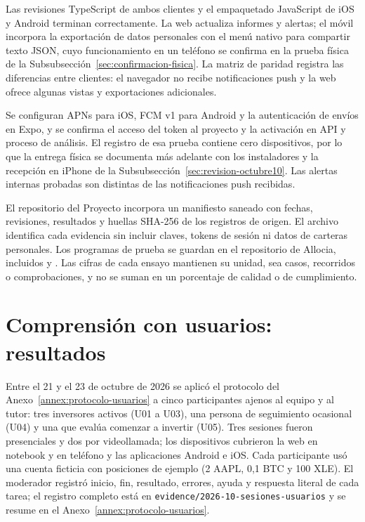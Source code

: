 Las revisiones TypeScript de ambos clientes y el empaquetado JavaScript de iOS y Android terminan correctamente. La web actualiza informes y alertas; el móvil incorpora la exportación de datos personales con el menú nativo para compartir texto JSON, cuyo funcionamiento en un teléfono se confirma en la prueba física de la Subsubsección~\ref{sec:confirmacion-fisica}. La matriz de paridad registra las diferencias entre clientes: el navegador no recibe notificaciones push y la web ofrece algunas vistas y exportaciones adicionales.

Se configuran APNs para iOS, FCM v1 para Android y la autenticación de envíos en Expo, y se confirma el acceso del token al proyecto y la activación en API y proceso de análisis. El registro de esa prueba contiene cero dispositivos, por lo que la entrega física se documenta más adelante con los instaladores y la recepción en iPhone de la Subsubsección~\ref{sec:revision-octubre10}. Las alertas internas probadas son distintas de las notificaciones push recibidas.

El repositorio del Proyecto incorpora un manifiesto saneado con fechas, revisiones, resultados y huellas SHA-256 de los registros de origen. El archivo  identifica cada evidencia sin incluir claves, tokens de sesión ni datos de carteras personales. Los programas de prueba se guardan en el repositorio de Allocia, incluidos  y . Las cifras de cada ensayo mantienen su unidad, sea casos, recorridos o comprobaciones, y no se suman en un porcentaje de calidad o de cumplimiento.

\section{Comprensión con usuarios: resultados}\label{sec:pruebas-usabilidad}

Entre el 21 y el 23 de octubre de 2026 se aplicó el protocolo del Anexo~\ref{annex:protocolo-usuarios} a cinco participantes ajenos al equipo y al tutor: tres inversores activos (U01 a U03), una persona de seguimiento ocasional (U04) y una que evalúa comenzar a invertir (U05). Tres sesiones fueron presenciales y dos por videollamada; los dispositivos cubrieron la web en notebook y en teléfono y las aplicaciones Android e iOS. Cada participante usó una cuenta ficticia con posiciones de ejemplo (2 AAPL, 0,1 BTC y 100 XLE). El moderador registró inicio, fin, resultado, errores, ayuda y respuesta literal de cada tarea; el registro completo está en \texttt{evidence/2026-10-sesiones-usuarios} y se resume en el Anexo~\ref{annex:protocolo-usuarios}.

